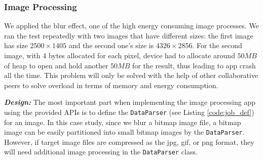 \documentclass{sig-alternate}
\begin{document}
\subsubsection{Image Processing}
We applied the blur effect, one of the high energy consuming image processes. We ran the test repeatedly with two images that have different sizes: the first image has size $2500 \times 1405$ and the second one's size is $4326 \times 2856$. For the second image, with 4 bytes allocated for each pixel, device had to allocate around $50MB$ of heap to open and hold another $50MB$ for the result, thus leading to app crash all the time. This problem will only be solved with the help of other collaborative peers to solve overload in terms of memory and energy consumption.

\textbf{\emph{Design:}}
The most important part when implementing the image processing app using the provided APIs is to define the \texttt{DataParser} (see Listing \ref{code:job_def}) for an image. In this case study, since we blur a bitmap image file, a bitmap image can be easily partitioned into small bitmap images by the \texttt{DataParser}. However, if target image files are compressed as the jpg, gif, or png format, they will need additional image processing in the \texttt{DataParser} class.


%
%
%
\end{document}
